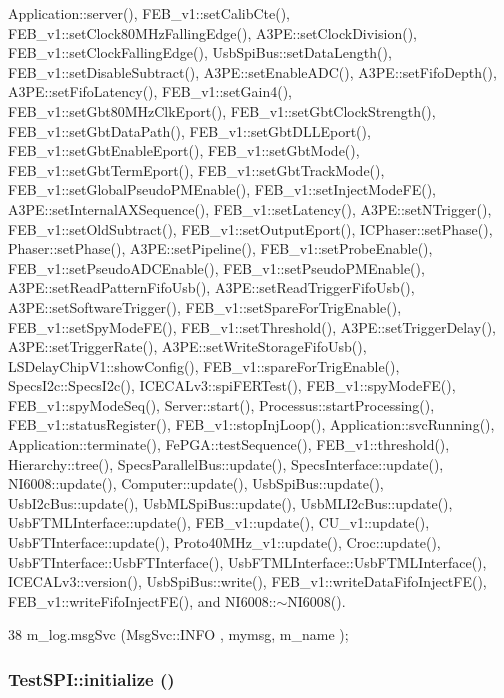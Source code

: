 Application::server(), FEB\_\-v1::setCalibCte(), FEB\_\-v1::setClock80MHzFallingEdge(), A3PE::setClockDivision(), FEB\_\-v1::setClockFallingEdge(), UsbSpiBus::setDataLength(), FEB\_\-v1::setDisableSubtract(), A3PE::setEnableADC(), A3PE::setFifoDepth(), A3PE::setFifoLatency(), FEB\_\-v1::setGain4(), FEB\_\-v1::setGbt80MHzClkEport(), FEB\_\-v1::setGbtClockStrength(), FEB\_\-v1::setGbtDataPath(), FEB\_\-v1::setGbtDLLEport(), FEB\_\-v1::setGbtEnableEport(), FEB\_\-v1::setGbtMode(), FEB\_\-v1::setGbtTermEport(), FEB\_\-v1::setGbtTrackMode(), FEB\_\-v1::setGlobalPseudoPMEnable(), FEB\_\-v1::setInjectModeFE(), A3PE::setInternalAXSequence(), FEB\_\-v1::setLatency(), A3PE::setNTrigger(), FEB\_\-v1::setOldSubtract(), FEB\_\-v1::setOutputEport(), ICPhaser::setPhase(), Phaser::setPhase(), A3PE::setPipeline(), FEB\_\-v1::setProbeEnable(), FEB\_\-v1::setPseudoADCEnable(), FEB\_\-v1::setPseudoPMEnable(), A3PE::setReadPatternFifoUsb(), A3PE::setReadTriggerFifoUsb(), A3PE::setSoftwareTrigger(), FEB\_\-v1::setSpareForTrigEnable(), FEB\_\-v1::setSpyModeFE(), FEB\_\-v1::setThreshold(), A3PE::setTriggerDelay(), A3PE::setTriggerRate(), A3PE::setWriteStorageFifoUsb(), LSDelayChipV1::showConfig(), FEB\_\-v1::spareForTrigEnable(), SpecsI2c::SpecsI2c(), ICECALv3::spiFERTest(), FEB\_\-v1::spyModeFE(), FEB\_\-v1::spyModeSeq(), Server::start(), Processus::startProcessing(), FEB\_\-v1::statusRegister(), FEB\_\-v1::stopInjLoop(), Application::svcRunning(), Application::terminate(), FePGA::testSequence(), FEB\_\-v1::threshold(), Hierarchy::tree(), SpecsParallelBus::update(), SpecsInterface::update(), NI6008::update(), Computer::update(), UsbSpiBus::update(), UsbI2cBus::update(), UsbMLSpiBus::update(), UsbMLI2cBus::update(), UsbFTMLInterface::update(), FEB\_\-v1::update(), CU\_\-v1::update(), UsbFTInterface::update(), Proto40MHz\_\-v1::update(), Croc::update(), UsbFTInterface::UsbFTInterface(), UsbFTMLInterface::UsbFTMLInterface(), ICECALv3::version(), UsbSpiBus::write(), FEB\_\-v1::writeDataFifoInjectFE(), FEB\_\-v1::writeFifoInjectFE(), and NI6008::$\sim$NI6008().


\begin{DoxyCode}
38 { m_log.msgSvc (MsgSvc::INFO    , mymsg, m_name ); }
\end{DoxyCode}
\hypertarget{classTestSPI_ab2c54cd233a04a583d96fde1f81d4bd6}{
\subsubsection[{initialize}]{ TestSPI::initialize ()}}
\label{classTestSPI_ab2c54cd233a04a583d96fde1f81d4bd6}


